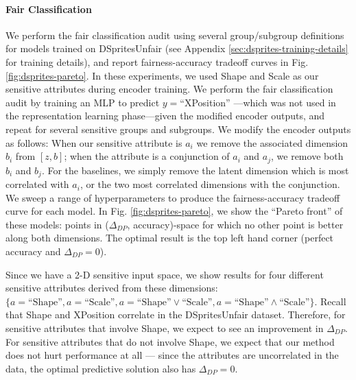 \paragraph{Fair Classification}
We perform the fair classification audit using several group/subgroup definitions for models trained on DSpritesUnfair (see Appendix \ref{sec:dsprites-training-details} for training details), and report fairness-accuracy tradeoff curves in Fig. \ref{fig:dsprites-pareto}.
In these experiments, we used Shape and Scale as our sensitive attributes during encoder training.
We perform the fair classification audit by training an MLP to predict $y=$``XPosition''%
---which was not used in the representation learning phase---given the modified encoder outputs, and repeat for several sensitive groups and subgroups.
We modify the encoder outputs as follows:
When our sensitive attribute is $a_i$ we remove the associated dimension $b_i$ from $[z,b]$; when the attribute is a conjunction of $a_i$ and $a_j$, we remove both $b_i$ and $b_j$.
For the baselines, we simply remove the latent dimension which is most correlated with $a_i$, or the two most correlated dimensions with the conjunction.
We sweep a range of hyperparameters to produce the fairness-accuracy tradeoff curve for each model.
In Fig. \ref{fig:dsprites-pareto}, we show the ``Pareto front'' of these models: points in ($\Delta_{DP}$, accuracy)-space for which no other point is better along both dimensions.
The optimal result is the top left hand corner (perfect accuracy and $\Delta_{DP} = 0$).

Since we have a 2-D sensitive input space, we show results for four different sensitive attributes derived from these dimensions: $\{a=\text{``Shape''}, a=\text{``Scale''}, a=\text{``Shape''}\vee\text{``Scale''}, a=\text{``Shape''}\wedge\text{``Scale''}\}$.
Recall that Shape and XPosition correlate in the DSpritesUnfair dataset.
Therefore, for sensitive attributes that involve Shape, we expect to see an improvement in $\Delta_{DP}$.
For sensitive attributes that do not involve Shape, we expect that our method does not hurt performance at all --- since the attributes are uncorrelated in the data, the optimal predictive solution also has $\Delta_{DP} = 0$.


